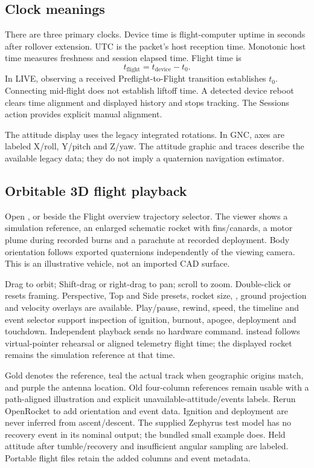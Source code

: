 \subsection{Clock meanings}
There are three primary clocks. Device time is flight-computer uptime in
seconds after rollover extension. UTC is the packet's host reception time.
Monotonic host time measures freshness and session elapsed time. Flight time is
\[
 t_{\mathrm{flight}}=t_{\mathrm{device}}-t_0.
\]
In LIVE, observing a received Preflight-to-Flight transition establishes
\(t_0\). Connecting mid-flight does not establish liftoff time. A detected device
reboot clears time alignment and displayed history and stops tracking. The
Sessions action  provides explicit
manual alignment.

The attitude display uses the legacy integrated rotations. In GNC, axes are
labeled X/roll, Y/pitch and Z/yaw. The attitude graphic and traces describe
the available legacy data; they do not imply a quaternion navigation estimator.

\subsection{Orbitable 3D flight playback}
Open , or  beside the Flight overview trajectory
selector. The viewer shows a simulation reference, an enlarged schematic rocket
with fins/canards, a motor plume during recorded burns and a parachute at recorded
deployment. Body orientation follows exported quaternions independently of the
viewing camera. This is an illustrative vehicle, not an imported CAD surface.

Drag to orbit; Shift-drag or right-drag to pan; scroll to zoom. Double-click or
 resets framing. Perspective, Top and Side presets, rocket size,
, ground projection and velocity overlays are available.
Play/pause, rewind, speed, the timeline and event selector support inspection of
ignition, burnout, apogee, deployment and touchdown. Independent playback sends
no hardware command.  instead follows virtual-pointer
rehearsal or aligned telemetry flight time; the displayed rocket remains the
simulation reference at that time.

Gold denotes the reference, teal the actual track when geographic origins match,
and purple the antenna location. Old four-column references remain usable with
a path-aligned illustration and explicit unavailable-attitude/events labels.
Rerun OpenRocket to add orientation and event data. Ignition and deployment are
never inferred from ascent/descent. The supplied Zephyrus test model has no
recovery event in its nominal output; the bundled small example does. Held
attitude after tumble/recovery and insufficient angular sampling are labeled.
Portable flight files retain the added columns and event metadata.

